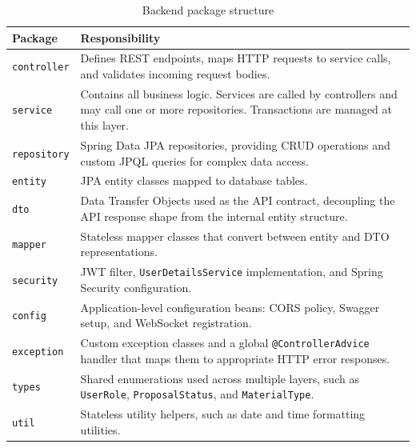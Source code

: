 \begin{table}[!ht]
    \centering
    \caption{Backend package structure}
    \label{tab:backend-packages}
    \renewcommand{\arraystretch}{1.4}
    \begin{tabularx}{\textwidth}{|p{3cm}|X|}
        \hline
        \textbf{Package} & \textbf{Responsibility} \\
        \hline
        \texttt{controller} & Defines REST endpoints, maps HTTP requests to service calls,
                              and validates incoming request bodies. \\
        \hline
        \texttt{service} & Contains all business logic. Services are called by controllers
                          and may call one or more repositories. Transactions are managed
                          at this layer. \\
        \hline
        \texttt{repository} & Spring Data JPA repositories, providing CRUD operations and
                              custom JPQL queries for complex data access. \\
        \hline
        \texttt{entity} & JPA entity classes mapped to database tables. \\
        \hline
        \texttt{dto} & Data Transfer Objects used as the API contract, decoupling the
                      API response shape from the internal entity structure. \\
        \hline
        \texttt{mapper} & Stateless mapper classes that convert between entity and DTO
                         representations. \\
        \hline
        \texttt{security} & JWT filter, \texttt{UserDetailsService} implementation, and
                           Spring Security configuration. \\
        \hline
        \texttt{config} & Application-level configuration beans: CORS policy, Swagger
                         setup, and WebSocket registration. \\
        \hline
        \texttt{exception} & Custom exception classes and a global
                            \texttt{@ControllerAdvice} handler that maps them to
                            appropriate HTTP error responses. \\
        \hline
        \texttt{types} & Shared enumerations used across multiple layers, such as
                        \texttt{UserRole}, \texttt{ProposalStatus}, and
                        \texttt{MaterialType}. \\
        \hline
        \texttt{util} & Stateless utility helpers, such as date and time formatting
                       utilities. \\
        \hline
    \end{tabularx}
\end{table}

